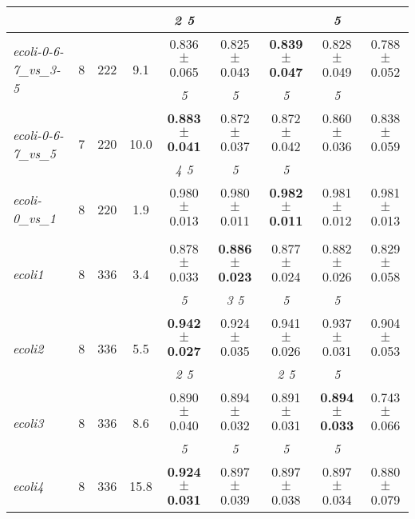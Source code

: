 \begin{table}[ht]
{\begin{tabular}{lcccccccc}
 & & &  & \textit{2 5 } & \textit{} & \textit{} & \textit{5 } & \textit{} \\ \bottomrule
\multirow{2}{*}{\textit{ecoli-0-6-7\_vs\_3-5}} & \multirow{2}{*}{8} & \multirow{2}{*}{222} & \multirow{2}{*}{9.1} & 0.836 $\pm$ 0.065 & 0.825 $\pm$ 0.043 & \textbf{0.839 $\pm$ 0.047} & 0.828 $\pm$ 0.049 & 0.788 $\pm$ 0.052 \\
 & & &  & \textit{5 } & \textit{5 } & \textit{5 } & \textit{5 } & \textit{} \\ \bottomrule
\multirow{2}{*}{\textit{ecoli-0-6-7\_vs\_5}} & \multirow{2}{*}{7} & \multirow{2}{*}{220} & \multirow{2}{*}{10.0} & \textbf{0.883 $\pm$ 0.041} & 0.872 $\pm$ 0.037 & 0.872 $\pm$ 0.042 & 0.860 $\pm$ 0.036 & 0.838 $\pm$ 0.059 \\
 & & &  & \textit{4 5 } & \textit{5 } & \textit{5 } & \textit{} & \textit{} \\ \bottomrule
\multirow{2}{*}{\textit{ecoli-0\_vs\_1}} & \multirow{2}{*}{8} & \multirow{2}{*}{220} & \multirow{2}{*}{1.9} & 0.980 $\pm$ 0.013 & 0.980 $\pm$ 0.011 & \textbf{0.982 $\pm$ 0.011} & 0.981 $\pm$ 0.012 & 0.981 $\pm$ 0.013 \\
 & & &  & \textit{} & \textit{} & \textit{} & \textit{} & \textit{} \\ \bottomrule
\multirow{2}{*}{\textit{ecoli1}} & \multirow{2}{*}{8} & \multirow{2}{*}{336} & \multirow{2}{*}{3.4} & 0.878 $\pm$ 0.033 & \textbf{0.886 $\pm$ 0.023} & 0.877 $\pm$ 0.024 & 0.882 $\pm$ 0.026 & 0.829 $\pm$ 0.058 \\
 & & &  & \textit{5 } & \textit{3 5 } & \textit{5 } & \textit{5 } & \textit{} \\ \bottomrule
\multirow{2}{*}{\textit{ecoli2}} & \multirow{2}{*}{8} & \multirow{2}{*}{336} & \multirow{2}{*}{5.5} & \textbf{0.942 $\pm$ 0.027} & 0.924 $\pm$ 0.035 & 0.941 $\pm$ 0.026 & 0.937 $\pm$ 0.031 & 0.904 $\pm$ 0.053 \\
 & & &  & \textit{2 5 } & \textit{} & \textit{2 5 } & \textit{5 } & \textit{} \\ \bottomrule
\multirow{2}{*}{\textit{ecoli3}} & \multirow{2}{*}{8} & \multirow{2}{*}{336} & \multirow{2}{*}{8.6} & 0.890 $\pm$ 0.040 & 0.894 $\pm$ 0.032 & 0.891 $\pm$ 0.031 & \textbf{0.894 $\pm$ 0.033} & 0.743 $\pm$ 0.066 \\
 & & &  & \textit{5 } & \textit{5 } & \textit{5 } & \textit{5 } & \textit{} \\ \bottomrule
\multirow{2}{*}{\textit{ecoli4}} & \multirow{2}{*}{8} & \multirow{2}{*}{336} & \multirow{2}{*}{15.8} & \textbf{0.924 $\pm$ 0.031} & 0.897 $\pm$ 0.039 & 0.897 $\pm$ 0.038 & 0.897 $\pm$ 0.034 & 0.880 $\pm$ 0.079 \\

\end{tabular}}
\end{table}
